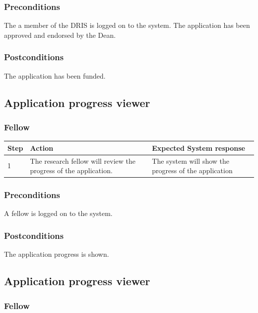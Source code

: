 \documentclass[12pt]{article}
\begin{document}
\subsubsection*{Preconditions}
The a member of the DRIS is logged on to the system. The application has been approved and endorsed by the Dean.

\subsubsection*{Postconditions}
The application has been funded.

\subsection{Application progress viewer}
\subsubsection{Fellow}

\begin{center}
\begin{tabular}{|l|p{6cm}|p{8cm}|}
\hline
Step & Action & Expected System response \\
\hline
1 & The research fellow will review the progress of the application. & The system will show the progress of the application \\
\hline
\end{tabular}
\end{center}

\subsubsection*{Preconditions}
A fellow is logged on to the system.

\subsubsection*{Postconditions}
The application progress is shown.

\subsection{Application progress viewer}
\subsubsection{Fellow}
\end{document}
